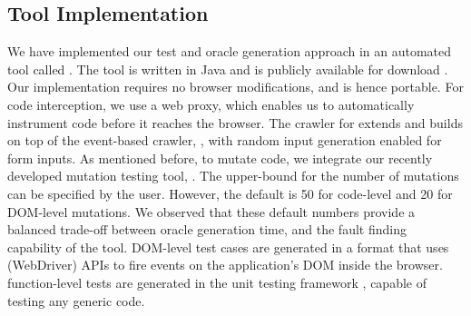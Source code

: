 \subsection{Tool Implementation} \label{Sec:tool}
We have implemented our \javascript test and oracle generation approach in an automated tool called \tool. The tool is written in Java and is publicly available for download \cite{pythia-dl}. Our implementation requires no browser modifications, and is hence portable. For \javascript code interception, we use a web proxy, which enables us to automatically instrument \javascript code before it reaches the browser. 
The crawler for \tool extends and builds on top of the  event-based crawler, \crawljax \cite{mesbah:tweb11}, with random input generation enabled for  form inputs.
%
As mentioned before, to mutate \javascript code, we integrate our recently developed mutation testing tool, \mutandis \cite{mirshokraie:icst13}. The upper-bound for the number of mutations can be specified by the 
user. However, the default is 50 for code-level and 20 for DOM-level mutations. We observed that these default numbers  provide a balanced trade-off between oracle generation time, and the fault finding capability of the tool. %
%
DOM-level test cases are generated in a \junit format that uses \selenium (WebDriver) APIs to fire events on the application's DOM inside the browser. \javascript function-level tests are generated in the \qunit unit testing framework \cite{quint}, capable of testing any generic \javascript code. 

